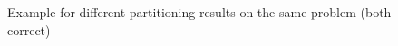 \begin{figure}[h]
\begin{subfigure}{0.25\textwidth}
  \end{subfigure}
  \caption{Example for different partitioning results on the same problem (both correct)}
  \label{fig:3_partitioning_example}
\end{figure}
